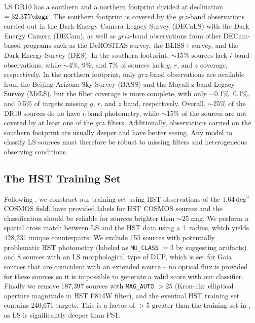 \documentclass[twocolumn]{aastex631}
\newcommand{\dr}[1]{DR{#1}}
\begin{document}
\begin{CJK*}{UTF8}{gbsn}
LS \dr{10} has a southern and a northern footprint divided at declination $=32.375\degr$. The southern footprint is covered by the 
$grz$-band observations carried out in the Dark Energy Camera Legacy Survey (DECaLS) with the Dark Energy Camera (DECam), as well as $griz$-band observations from other DECam-based programs such as the DeROSITAS survey, the BLISS+ survey, and the Dark Energy Survey (DES). In the southern footprint, $\sim$15\% sources lack $i$-band observations, while $\sim$4\%, 9\%, and 7\% of sources lack $g$, $r$, and $z$ coverage, respectively. In the northern footprint, only $grz$-band observations are available from the Beijing-Arizona Sky Survey (BASS) and the Mayall z-band Legacy Survey (MzLS), but the filter coverage is more complete, with only $\sim$0.1\%, 0.1\%, and 0.5\% of targets missing $g$, $r$, and $z$ band, respectively. Overall, $\sim$25\% of the \dr{10} sources do no have $i$-band photometry, while $\sim$15\% of the sources are not covered by at least one of the $grz$ filters. Additionally, observations carried on the southern footprint are usually deeper and have better seeing. Any model to classify LS sources must therefore be robust to missing filters and heterogeneous observing conditions.

\subsection{The HST Training Set}\label{sec:HST}
Following , we construct our training set using HST observations of the 1.64\,deg$^2$ COSMOS field. \cite{Leauthaud_2007} have provided labels for HST COSMOS sources and the classification should be reliable for sources brighter than $\sim$25\,mag. We perform a spatial cross match between LS and the HST data using a 1\arcsec\ radius, which yields 428,231 unique counterparts. We exclude 155 sources with potentially problematic HST photometry (labeled as \texttt{MU\_CLASS} $=3$ by \citealp{Leauthaud_2007} suggesting artifacts) and 8 sources with an LS morphological type of DUP, which is set for Gaia sources that are coincident with an extended source -- no optical flux is provided for these sources so it is impossible to generate a valid score with our classifier. Finally we remove 187,397 sources with \texttt{MAG\_AUTO} $>25$ (Kron-like elliptical aperture magnitude in HST F814W filter), and the eventual HST training set contains 240,671 targets. This is a factor of $>$5 greater than the training set in , as LS is significantly deeper than PS1.


\end{CJK*}
\end{document}
